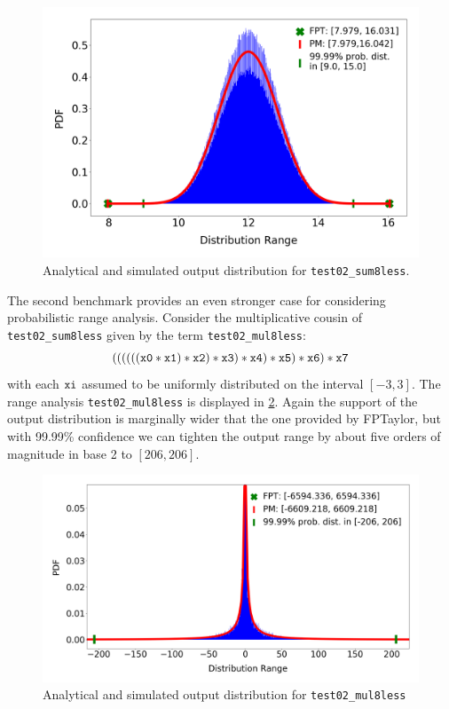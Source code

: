 \documentclass[10pt,conference]{IEEEtran}
\begin{document}
\begin{figure}[h!]
	\includegraphics[scale=0.22]{pics/range_dist}
	\caption{Analytical and simulated output distribution for \texttt{test02\_sum8less}.}
	\label{fig:impl:benchmark}
\end{figure}

The second benchmark provides an even stronger case for considering probabilistic range analysis. Consider the multiplicative cousin of \texttt{test02\_sum8less} given by the term \texttt{test02\_mul8less}:
\[
\tt{((((((x0 * x1) * x2) * x3) * x4) * x5) * x6) * x7}
\]
with each $\tt xi$ assumed to be uniformly distributed on the interval $\left[-3,3\right]$. The range analysis \texttt{test02\_mul8less} is displayed in \cref{fig:impl:benchmark2}. Again the support of the output distribution is marginally wider that the one provided by FPTaylor, but with 99.99\% confidence we can tighten the output range by about five orders of magnitude in base 2 to $\left[206,206\right]$.
\begin{figure}[h!]
	\includegraphics[scale=0.177]{pics/mul}
	\caption{Analytical and simulated output distribution for \texttt{test02\_mul8less}}
	\label{fig:impl:benchmark2}
\end{figure}





\end{document}
